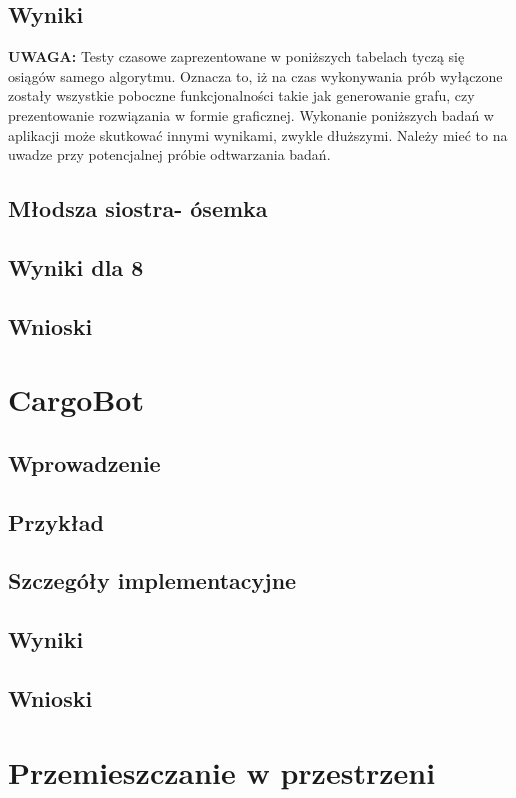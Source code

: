     \subsection{Wyniki}

    \textbf{UWAGA:} Testy czasowe zaprezentowane w poniższych tabelach tyczą się osiągów samego algorytmu. Oznacza to, iż na czas wykonywania prób
    wyłączone zostały wszystkie poboczne funkcjonalności takie jak generowanie grafu, czy prezentowanie rozwiązania w formie graficznej. 
    Wykonanie poniższych badań w aplikacji może skutkować innymi wynikami, zwykle dłuższymi. Należy mieć to na uwadze przy potencjalnej 
    próbie odtwarzania badań.

    



    \subsection{Młodsza siostra- ósemka}

    \subsection{Wyniki dla 8}
    \subsection{Wnioski}
\section{CargoBot}
    \subsection{Wprowadzenie}
    \subsection{Przykład}
    \subsection{Szczegóły implementacyjne}
    \subsection{Wyniki}
    \subsection{Wnioski}
\section{Przemieszczanie w przestrzeni}
